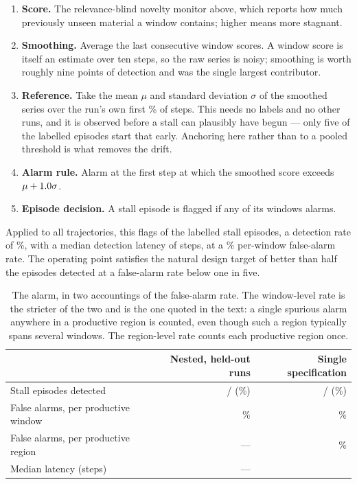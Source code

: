 \begin{enumerate}[leftmargin=1.5em,itemsep=1pt,topsep=2pt]
\item \textbf{Score.} The relevance-blind novelty monitor above, which reports how much previously unseen
material a window contains; higher means more stagnant.
\item \textbf{Smoothing.} Average the last \palSmooth{} consecutive window scores. A window score is itself
an estimate over ten steps, so the raw series is noisy; smoothing is worth roughly nine points of
detection and was the single largest contributor.
\item \textbf{Reference.} Take the mean $\mu$ and standard deviation $\sigma$ of the smoothed series over
the run's own first \palOpen{}\% of steps. This needs no labels and no other runs, and it is observed
before a stall can plausibly have begun --- only five of the \pregEpisodes{} labelled episodes start that
early. Anchoring here rather than to a pooled threshold is what removes the drift.
\item \textbf{Alarm rule.} Alarm at the first step at which the smoothed score exceeds
$\mu + 1.0{}\sigma$.
\item \textbf{Episode decision.} A stall episode is flagged if any of its windows alarms.
\end{enumerate}

Applied to all \pnTraj{} trajectories, this flags \palDetN{} of the \palDetTot{} labelled stall episodes, a
detection rate of \palDet{}\%, with a median detection latency of \palLatency{} steps, at a
\palFaWin{}\% per-window false-alarm rate. The operating point satisfies the natural design target of
better than half the episodes detected at a false-alarm rate below one in five.

\begin{table}[t]\centering
\small
\caption{The alarm, in two accountings of the false-alarm rate. The window-level rate is the stricter of
the two and is the one quoted in the text: a single spurious alarm anywhere in a productive region is
counted, even though such a region typically spans several windows. The region-level rate counts each
productive region once.}
\label{tab:alarm}
\begin{tabular}{lrr}
\toprule
 & Nested, held-out runs & Single specification \\
\midrule
Stall episodes detected & \pnestedDetN{}/\pnestedTot{} (\pnestedDet{}\%) & \palDetN{}/\palDetTot{} (\palDet{}\%) \\
False alarms, per productive window & \pnestedFa{}\% & \palFaWin{}\% \\
False alarms, per productive region & --- & \palFaRegion{}\% \\
Median latency (steps) & --- & \palLatency{} \\
\bottomrule
\end{tabular}
\end{table}

